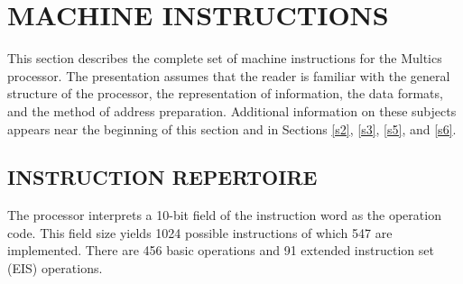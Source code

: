 
\newcommand{\inbar}[1]{
\inlbl{\hspace{1em}Not BAR mode}{#1}
}


\newcommand{\intru}[1]{
\inlbl{\hspace{1em}Truncation}{#1}
}


\newcommand{\innte}[1]{
\inlbl{NOTES:}{#1}
}


\newcommand{\innta}[1]{
\inull {#1}
}


\newcommand{\inrpl}[1]{
\innte {Attempted repetition with the rpl instruction causes an illegal procedure fault.}
}


\newcommand{\inrpa}[1]{
\innta {Attempted repetition with the rpl instruction causes an illegal procedure fault.}
}

\newcommand{\inrrr}{
\innte {Attempted repetition with the rpt, rpd, or rpl instructions causes an
illegal procedure fault.}
}

\section{MACHINE INSTRUCTIONS}


This section describes the complete set of machine instructions for the Multics
processor.  The presentation assumes that the reader is familiar with the
general structure of the processor, the representation of information, the data
formats, and the method of address preparation.  Additional information on
these subjects appears near the beginning of this section and in Sections
\ref{s2}, \ref{s3}, \ref{s5}, and \ref{s6}.


\subsection{INSTRUCTION REPERTOIRE}

The processor interprets a 10-bit field of the instruction word as the
operation code. This field size yields 1024 possible instructions of which 547
are implemented. There are 456 basic operations and 91 extended instruction set
(EIS) operations.



